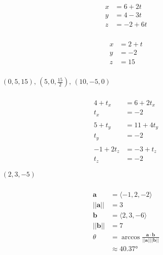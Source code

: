 \documentclass{article}
\begin{document}
\begin{align*}
  x & = 6 + 2 t  \\
  y & = 4 - 3 t  \\
  z & = -2 + 6 t
\end{align*}

\setcounter{subsubsection}{24}
\subsubsection{}

\begin{align*}
  x & = 2 + t \\
  y & = -2    \\
  z & = 15
\end{align*}

\setcounter{subsubsection}{28}
\subsubsection{}

$(0, 5, 15), \,(5, 0, \frac{15}{2}), \,(10, -5, 0)$

\setcounter{subsubsection}{30}
\subsubsection{}

\begin{align*}
  4 + t_x    & = 6 + 2 t_x  \\
  t_x        & = -2         \\ \\
  5 + t_y    & = 11 + 4 t_y \\
  t_y        & = -2         \\ \\
  -1 + 2 t_z & = -3 + t_z   \\
  t_z        & = -2
\end{align*}

$(2, 3, -5)$

\setcounter{subsubsection}{34}
\subsubsection{}

\begin{align*}
  \mathbf{a}     & = \langle -1, 2, -2 \rangle                                                 \\
  ||\mathbf{a}|| & = 3                                                                         \\
  \mathbf{b}     & = \langle 2, 3, -6 \rangle                                                  \\
  ||\mathbf{b}|| & = 7                                                                         \\
  \theta         & = \arccos \frac{\mathbf{a} \cdot \mathbf{b}}{||\mathbf{a}|| ||\mathbf{b}||} \\
                 & \approx \ang{40.37}
\end{align*}
\end{document}
